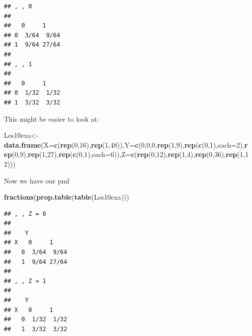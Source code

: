 \documentclass[]{book}
\newenvironment{Shaded}{\begin{snugshade}}{\end{snugshade}}
\newcommand{\KeywordTok}[1]{\textcolor[rgb]{0.13,0.29,0.53}{\textbf{#1}}}
\newcommand{\DataTypeTok}[1]{\textcolor[rgb]{0.13,0.29,0.53}{#1}}
\newcommand{\DecValTok}[1]{\textcolor[rgb]{0.00,0.00,0.81}{#1}}
\newcommand{\NormalTok}[1]{#1}
\theoremstyle{definition}
\theoremstyle{definition}
\theoremstyle{definition}
\theoremstyle{remark}
\begin{document}
\begin{verbatim}
## , , 0
## 
##   0     1    
## 0  3/64  9/64
## 1  9/64 27/64
## 
## , , 1
## 
##   0     1    
## 0  1/32  1/32
## 1  3/32  3/32
\end{verbatim}

This might be easier to look at:

\begin{Shaded}
\begin{Highlighting}[]
\NormalTok{Les10exa<-}\KeywordTok{data.frame}\NormalTok{(}\DataTypeTok{X=}\KeywordTok{c}\NormalTok{(}\KeywordTok{rep}\NormalTok{(}\DecValTok{0}\NormalTok{,}\DecValTok{16}\NormalTok{),}\KeywordTok{rep}\NormalTok{(}\DecValTok{1}\NormalTok{,}\DecValTok{48}\NormalTok{)),}\DataTypeTok{Y=}\KeywordTok{c}\NormalTok{(}\DecValTok{0}\NormalTok{,}\DecValTok{0}\NormalTok{,}\DecValTok{0}\NormalTok{,}\KeywordTok{rep}\NormalTok{(}\DecValTok{1}\NormalTok{,}\DecValTok{9}\NormalTok{),}\KeywordTok{rep}\NormalTok{(}\KeywordTok{c}\NormalTok{(}\DecValTok{0}\NormalTok{,}\DecValTok{1}\NormalTok{),}\DataTypeTok{each=}\DecValTok{2}\NormalTok{),}\KeywordTok{rep}\NormalTok{(}\DecValTok{0}\NormalTok{,}\DecValTok{9}\NormalTok{),}\KeywordTok{rep}\NormalTok{(}\DecValTok{1}\NormalTok{,}\DecValTok{27}\NormalTok{),}\KeywordTok{rep}\NormalTok{(}\KeywordTok{c}\NormalTok{(}\DecValTok{0}\NormalTok{,}\DecValTok{1}\NormalTok{),}\DataTypeTok{each=}\DecValTok{6}\NormalTok{)),}\DataTypeTok{Z=}\KeywordTok{c}\NormalTok{(}\KeywordTok{rep}\NormalTok{(}\DecValTok{0}\NormalTok{,}\DecValTok{12}\NormalTok{),}\KeywordTok{rep}\NormalTok{(}\DecValTok{1}\NormalTok{,}\DecValTok{4}\NormalTok{),}\KeywordTok{rep}\NormalTok{(}\DecValTok{0}\NormalTok{,}\DecValTok{36}\NormalTok{),}\KeywordTok{rep}\NormalTok{(}\DecValTok{1}\NormalTok{,}\DecValTok{12}\NormalTok{)))}
\end{Highlighting}
\end{Shaded}

Now we have our pmf

\begin{Shaded}
\begin{Highlighting}[]
\KeywordTok{fractions}\NormalTok{(}\KeywordTok{prop.table}\NormalTok{(}\KeywordTok{table}\NormalTok{(Les10exa)))}
\end{Highlighting}
\end{Shaded}

\begin{verbatim}
## , , Z = 0
## 
##    Y
## X   0     1    
##   0  3/64  9/64
##   1  9/64 27/64
## 
## , , Z = 1
## 
##    Y
## X   0     1    
##   0  1/32  1/32
##   1  3/32  3/32
\end{verbatim}
\end{document}

